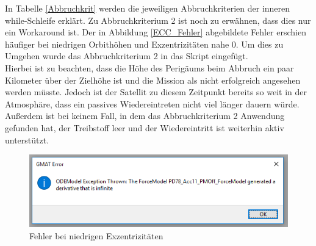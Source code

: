In Tabelle \eqref{Abbruchkrit} werden die jeweiligen Abbruchkriterien der inneren while-Schleife erklärt. Zu Abbruchkriterium 2 ist noch zu erwähnen, dass dies nur ein Workaround ist. 
Der in Abbildung \eqref{ECC_Fehler} abgebildete Fehler erschien häufiger bei niedrigen Orbithöhen und Exzentrizitäten nahe 0. Um dies zu Umgehen wurde das Abbruchkriterium 2 in das Skript eingefügt.\\
Hierbei ist zu beachten, dass die Höhe des Perigäums beim Abbruch ein paar Kilometer über der Zielhöhe ist und die Mission als nicht erfolgreich angesehen werden müsste. Jedoch ist der Satellit zu diesem Zeitpunkt bereits so weit in der Atmosphäre, dass ein passives Wiedereintreten nicht viel länger dauern würde. Außerdem ist bei keinem Fall, in dem das Abbruchkriterium 2 Anwendung gefunden hat, der Treibstoff leer und der Wiedereintritt ist weiterhin aktiv unterstützt.

\begin{figure}[h!]
\includegraphics{./graphics/GMAT/ECC_Fehler.png}
\caption{Fehler bei niedrigen Exzentrizitäten}
\label{ECC_Fehler}
\end{figure} 





